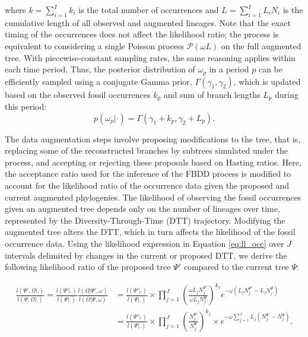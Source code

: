 \documentclass[oupdraft]{sysbio}
\begin{document}
where $k = \sum_{i=1}^I k_i$ is the total number of occurrences and $L = \sum_{i=1}^I L_i N_i$ is the cumulative length of all observed and augmented lineages. Note that the exact timing of the occurrences does not affect the likelihood ratio; the process is equivalent to considering a single Poisson process $\mathcal P(\omega L)$ on the full augmented tree. With piecewise-constant sampling rates, the same reasoning applies within each time period. Thus, the posterior distribution of $\omega_p$ in a period $p$ can be efficiently sampled using a conjugate Gamma prior, $\Gamma(\gamma_1, \gamma_2)$, which is updated based on the observed fossil occurrences $k_p$ and sum of branch lengths $L_p$ during this period:
\begin{equation*}
p(\omega_p| \cdot) = \Gamma(\gamma_1 + k_p, \gamma_2 + L_p).
\end{equation*}

The data augmentation steps involve proposing modifications to the tree, that is, replacing some of the reconstructed branches by subtrees simulated under the process, and accepting or rejecting these proposals based on Hasting ratios. Here, the acceptance ratio used for the inference of the FBDD process \citep{quintero_rise_2025} is modified to account for the likelihood ratio of the occurrence data given the proposed and current augmented phylogenies. The likelihood of observing the fossil occurrences given an augmented tree depends only on the number of lineages over time, represented by the Diversity-Through-Time (DTT) trajectory. Modifying the augmented tree alters the DTT, which in turn affects the likelihood of the fossil occurrence data. Using the likelihood expression in Equation \ref{eq:ll_occ} over $J$ intervals delimited by changes in the current or proposed DTT, we derive the following likelihood ratio of the proposed tree $\Psi'$ compared to the current tree $\Psi$:

\begin{align*}
\frac{l(\Psi', \Omega | . )}{l(\Psi, \Omega | . )} = \frac{l(\Psi'|.)}{l(\Psi|.)}\frac{l(\Omega|\Psi', \omega)}{l(\Omega|\Psi, \omega)} 
&= \frac{l(\Psi'|.)}{l(\Psi|.)} \times \prod_{j=1}^J \left( \frac{\omega L_j N_j^{\Psi'}}{\omega L_j N_j^{\Psi}} \right)^{k_j} e^{-\omega (L_j N_j^{\Psi'} - L_j N_j^{\Psi})}\\
&= \frac{l(\Psi'|.)}{l(\Psi|.)} \times \prod_{j=1}^J \left( \frac{N_j^{\Psi'}}{N_j^{\Psi}} \right)^{k_j} \times e^{-\omega \sum_{j=1}^J L_j(N_j^{\Psi'} - N_j^{\Psi})}.
\end{align*}
\end{document}
